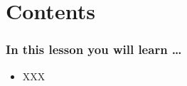 

\section{Contents}


\begin{frame}
  \frametitle{In this lesson you will learn \dots}
  \begin{itemize}
  \item XXX
  \end{itemize}
\end{frame}

